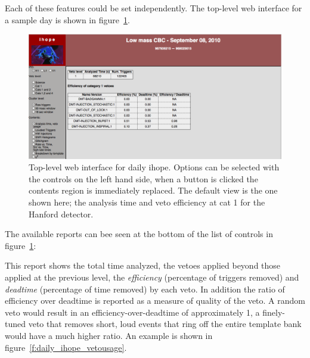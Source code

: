 Each of these features could be set independently.  The top-level web
interface for a sample day is shown in figure~\ref{f:daily_ihope_top}.

\begin{figure}
  \includegraphics[width=\linewidth]{figures/detchar/daily_ihope_top}
  \caption[Top-level web interface for daily ihope]{
  \label{f:daily_ihope_top}
Top-level web interface for daily ihope.  Options can be selected with
the controls on the left hand side, when a button is clicked the
contents region is immediately replaced.  The default view is the one
shown here; the analysis time and veto efficiency at cat 1 for the
Hanford detector.}
\end{figure}%

The available reports can bee seen at the bottom of the list of
controls in figure~\ref{f:daily_ihope_top}:


This report shows the total time analyzed, the vetoes applied beyond
those applied at the previous level, the \emph{efficiency} (percentage
of triggers removed) and \emph{deadtime} (percentage of time removed)
by each veto.  In addition the ratio of efficiency over deadtime is
reported as a measure of quality of the veto.  A random veto would
result in an efficiency-over-deadtime of approximately 1, a
finely-tuned veto that removes short, loud events that ring off the
entire template bank would have a much higher ratio.   An example is
shown in figure~\ref{f:daily_ihope_vetousage}.


